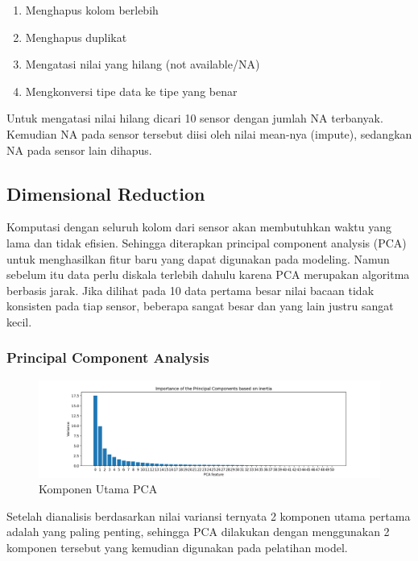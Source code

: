     \begin{enumerate}
        \item Menghapus kolom berlebih
        \item Menghapus duplikat
        \item Mengatasi nilai yang hilang (not available/NA)
        \item Mengkonversi tipe data ke tipe yang benar
    \end{enumerate}
    
    Untuk mengatasi nilai hilang dicari 10 sensor dengan jumlah NA terbanyak. Kemudian NA pada sensor tersebut diisi oleh nilai mean-nya (impute), sedangkan NA pada sensor lain dihapus.

    \subsection{Dimensional Reduction}

    Komputasi dengan seluruh kolom dari sensor akan membutuhkan waktu yang lama dan tidak efisien. Sehingga diterapkan principal component analysis (PCA) untuk menghasilkan fitur baru yang dapat digunakan pada modeling. Namun sebelum itu data perlu diskala terlebih dahulu karena PCA merupakan algoritma berbasis jarak. Jika dilihat pada 10 data pertama besar nilai bacaan tidak konsisten pada tiap sensor, beberapa sangat besar dan yang lain justru sangat kecil.

        \subsubsection{Principal Component Analysis}

        \begin{figure}[h]
            \centering
            \includegraphics[width=\textwidth]{resources/Acuan/PCA_Plot.png}
            \caption{Komponen Utama PCA}
        \end{figure}

        Setelah dianalisis berdasarkan nilai variansi ternyata 2 komponen utama pertama adalah yang paling penting, sehingga PCA dilakukan dengan menggunakan 2 komponen tersebut yang kemudian digunakan pada pelatihan model.


